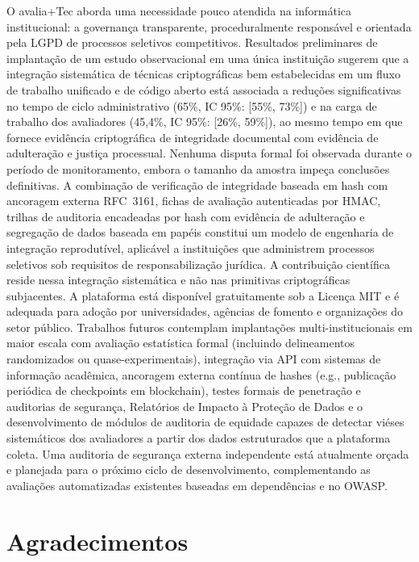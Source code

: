 \documentclass[preprint,12pt,a4paper]{elsarticle}
\begin{document}
O avalia+Tec aborda uma necessidade pouco atendida na informática institucional: a governança transparente, proceduralmente responsável e orientada pela LGPD de processos seletivos competitivos. Resultados preliminares de implantação de um estudo observacional em uma única instituição sugerem que a integração sistemática de técnicas criptográficas bem estabelecidas em um fluxo de trabalho unificado e de código aberto está associada a reduções significativas no tempo de ciclo administrativo (65\%, IC 95\%: [55\%, 73\%]) e na carga de trabalho dos avaliadores (45,4\%, IC 95\%: [26\%, 59\%]), ao mesmo tempo em que fornece evidência criptográfica de integridade documental com evidência de adulteração e justiça processual. Nenhuma disputa formal foi observada durante o período de monitoramento, embora o tamanho da amostra impeça conclusões definitivas. A combinação de verificação de integridade baseada em hash com ancoragem externa RFC~3161, fichas de avaliação autenticadas por HMAC, trilhas de auditoria encadeadas por hash com evidência de adulteração e segregação de dados baseada em papéis constitui um modelo de engenharia de integração reprodutível, aplicável a instituições que administrem processos seletivos sob requisitos de responsabilização jurídica. A contribuição científica reside nessa integração sistemática e não nas primitivas criptográficas subjacentes. A plataforma está disponível gratuitamente sob a Licença MIT e é adequada para adoção por universidades, agências de fomento e organizações do setor público. Trabalhos futuros contemplam implantações multi-institucionais em maior escala com avaliação estatística formal (incluindo delineamentos randomizados ou quase-experimentais), integração via API com sistemas de informação acadêmica, ancoragem externa contínua de hashes (e.g., publicação periódica de checkpoints em blockchain), testes formais de penetração e auditorias de segurança, Relatórios de Impacto à Proteção de Dados e o desenvolvimento de módulos de auditoria de equidade capazes de detectar viéses sistemáticos dos avaliadores a partir dos dados estruturados que a plataforma coleta. Uma auditoria de segurança externa independente está atualmente orçada e planejada para o próximo ciclo de desenvolvimento, complementando as avaliações automatizadas existentes baseadas em dependências e no OWASP.

\section*{Agradecimentos}
\end{document}
